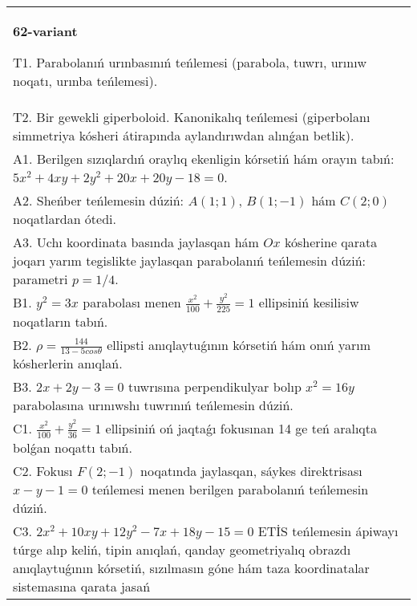 \documentclass{article}
\begin{document}
\begin{tabular}{m{17cm}}
\textbf{62-variant}
\newline

T1. Parabolanıń urınbasınıń teńlemesi (parabola, tuwrı, urınıw noqatı, urınba teńlemesi).\\

T2. Bir gewekli giperboloid. Kanonikalıq teńlemesi (giperbolanı simmetriya kósheri átirapında aylandırıwdan alınǵan betlik).\\

A1. Berilgen sızıqlardıń oraylıq ekenligin kórsetiń hám orayın tabıń: $5 x^{2}+4 xy+2 y^{2}+20 x+20 y-18=0$.\\

A2. Sheńber teńlemesin dúziń: $A (1;1) $, $B (1;-1) $ hám $C (2;0) $ noqatlardan ótedi.\\

A3. Uchı koordinata basında jaylasqan hám $Ox$ kósherine qarata joqarı yarım tegislikte jaylasqan parabolanıń teńlemesin dúziń: parametri $p=1/4$.\\

B1. $y^{2} = 3x$ parabolası menen $\frac{x^{2}}{100} + \frac{y^{2}}{225} = 1$ ellipsiniń kesilisiw noqatların tabıń.  \\

B2. $\rho = \frac{144}{13 - 5cos\theta}$ ellipsti anıqlaytuǵının kórsetiń hám onıń yarım kósherlerin anıqlań.\\

B3. $2x + 2y - 3 = 0$ tuwrısına perpendikulyar bolıp $x^{2} = 16y$ parabolasına urınıwshı tuwrınıń teńlemesin dúziń.  \\

C1. $\frac{x^{2}}{100} + \frac{y^{2}}{36} = 1$ ellipsiniń oń jaqtaǵı fokusınan 14 ge teń aralıqta bolǵan noqattı tabıń.  \\

C2. Fokusı $F(2; - 1)$ noqatında jaylasqan, sáykes direktrisası $x - y - 1 = 0$ teńlemesi menen berilgen parabolanıń teńlemesin dúziń.  \\

C3. $2x^{2} + 10xy + 12y^{2} - 7x + 18y - 15 = 0$ ETİS teńlemesin ápiwayı túrge alıp keliń, tipin anıqlań, qanday geometriyalıq obrazdı anıqlaytuǵının kórsetiń, sızılmasın góne hám taza koordinatalar sistemasına qarata jasań  \\

\end{tabular}
\vspace{1cm}
\end{document}
